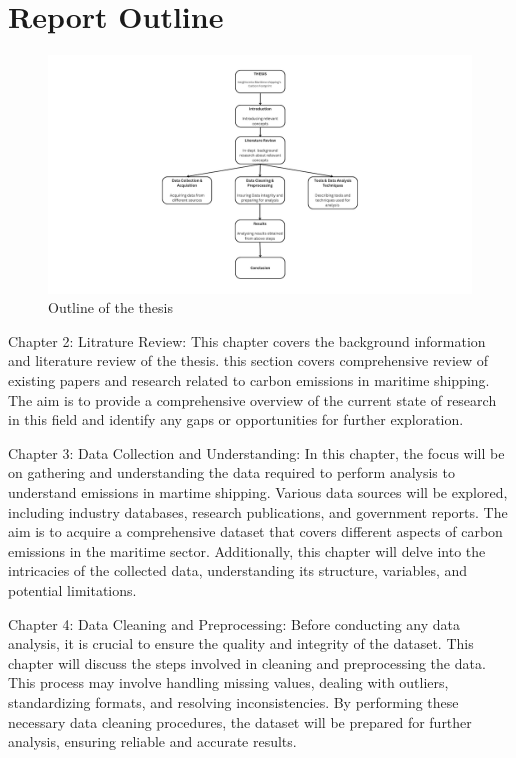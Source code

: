 \section{Report Outline}

\begin{figure}[ht]
    \centering
    \includegraphics[width=1\textwidth]{images/thesis_outline.png}
    \caption{Outline of the thesis}
    \label{fig:outline}
\end{figure}

\noindent Chapter 2: Litrature Review: This chapter covers the background information and literature review of the thesis.
this section covers comprehensive review of existing papers and research related to carbon emissions in maritime shipping.
The aim is to provide a comprehensive overview of the current state of research in this field and identify any gaps or opportunities for further exploration.


\noindent Chapter 3: Data Collection and Understanding:
In this chapter, the focus will be on gathering and understanding the data required to perform analysis to understand emissions in martime shipping.
Various data sources will be explored, including industry databases, research publications, and government reports.
The aim is to acquire a comprehensive dataset that covers different aspects of carbon emissions in the maritime sector.
Additionally, this chapter will delve into the intricacies of the collected data, understanding its structure, variables, and potential limitations.

\noindent Chapter 4: Data Cleaning and Preprocessing:
Before conducting any data analysis, it is crucial to ensure the quality and integrity of the dataset.
This chapter will discuss the steps involved in cleaning and preprocessing the data.
This process may involve handling missing values, dealing with outliers, standardizing formats, and resolving inconsistencies.
By performing these necessary data cleaning procedures, the dataset will be prepared for further analysis, ensuring reliable and accurate results.

